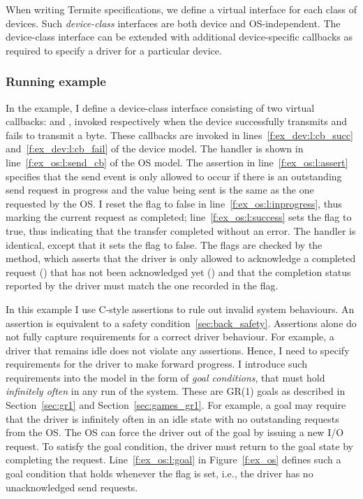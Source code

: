 When writing Termite specifications, we define a virtual interface for each class of devices.  Such \emph{device-class} interfaces are both device and OS-independent.  The device-class interface can be extended with additional device-specific callbacks as required to specify a driver for a particular device. 

\subsubsection{Running example}

In the example, I define a device-class interface consisting of two virtual callbacks:  and , invoked respectively when the device successfully transmits and fails to transmit a byte.  These callbacks are invoked in lines~\ref{f:ex_dev:l:cb_succ} and~\ref{f:ex_dev:l:cb_fail} of the device model.  The  handler is shown in line~\ref{f:ex_os:l:send_cb} of the OS model.  The assertion in line~\ref{f:ex_os:l:assert} specifies that the send event is only allowed to occur if there is an outstanding send request in progress and the value being sent is the same as the one requested by the OS\@.  I reset the  flag to false in line~\ref{f:ex_os:l:inprogress}, thus marking the current request as completed; line~\ref{f:ex_os:l:success} sets the  flag to true, thus indicating that the transfer completed without an error.  The  handler is identical, except that it sets the  flag to false.  The flags are checked by the  method, which asserts that the driver is only allowed to acknowledge a completed request () that has not been acknowledged yet () and that the completion status reported by the driver must match the one recorded in the  flag.

In this example I use C-style assertions to rule out invalid system behaviours.  An assertion is equivalent to a safety condition~\ref{sec:back_safety}. Assertions alone do not fully capture requirements for a correct driver behaviour. For example, a driver that remains idle does not violate any assertions. Hence, I need to specify requirements for the driver to make forward progress.  I introduce such requirements into the model in the form of \emph{goal conditions}, that must hold \emph{infinitely often} in any run of the system.  These are GR(1) goals as described in Section~\ref{sec:gr1} and Section~\ref{sec:games_gr1}. For example, a goal may require that the driver is infinitely often in an idle state with no outstanding requests from the OS\@.  The OS can force the driver out of the goal by issuing a new I/O request.  To satisfy the goal condition, the driver must return to the goal state by completing the request.  Line~\ref{f:ex_os:l:goal} in Figure~\ref{f:ex_os} defines such a goal condition that holds whenever the  flag is set, i.e., the driver has no unacknowledged send requests.


